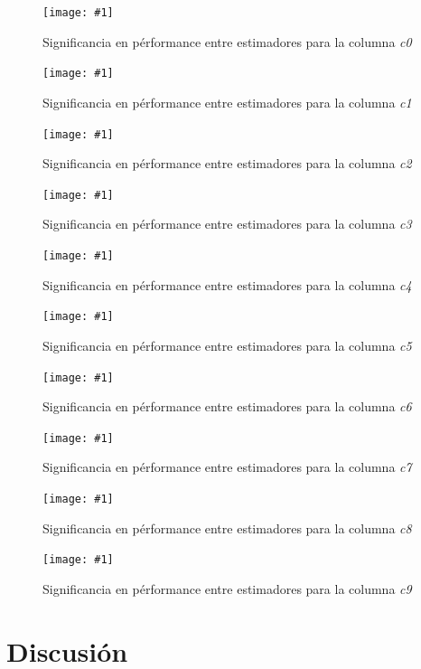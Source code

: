 \documentclass[a4paper, 10pt, twoside]{article}
\newcommand{\grafico}[3]{
  \begin{figure}[H]
    \texttt{[image: \#1]}
    \caption{#2}
    \label{#3}
  \end{figure}
}
\begin{document}
\grafico{plot-significance-c0}
        {Significancia en pérformance entre estimadores para la columna \emph{c0}}
        {student-columna-c0}

\grafico{plot-significance-c1}
        {Significancia en pérformance entre estimadores para la columna \emph{c1}}
        {student-columna-c1}

\grafico{plot-significance-c2}
        {Significancia en pérformance entre estimadores para la columna \emph{c2}}
        {student-columna-c2}

\grafico{plot-significance-c3}
        {Significancia en pérformance entre estimadores para la columna \emph{c3}}
        {student-columna-c3}

\grafico{plot-significance-c4}
        {Significancia en pérformance entre estimadores para la columna \emph{c4}}
        {student-columna-c4}

\grafico{plot-significance-c5}
        {Significancia en pérformance entre estimadores para la columna \emph{c5}}
        {student-columna-c5}

\grafico{plot-significance-c6}
        {Significancia en pérformance entre estimadores para la columna \emph{c6}}
        {student-columna-c6}

\grafico{plot-significance-c7}
        {Significancia en pérformance entre estimadores para la columna \emph{c7}}
        {student-columna-c7}

\grafico{plot-significance-c8}
        {Significancia en pérformance entre estimadores para la columna \emph{c8}}
        {student-columna-c8}

\grafico{plot-significance-c9}
        {Significancia en pérformance entre estimadores para la columna \emph{c9}}
        {student-columna-c9}



\section{Discusión}
\end{document}
